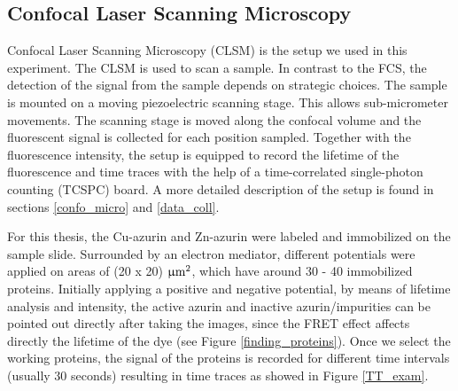 \documentclass[twoside,single]{lion-msc}
\begin{document}
\subsection{Confocal Laser Scanning Microscopy}
Confocal Laser Scanning Microscopy (CLSM) is the setup we used in this experiment. The CLSM is used to scan a sample. In contrast to the FCS, the detection of the signal from the sample depends on strategic choices. The sample is mounted on a moving piezoelectric scanning stage. This allows sub-micrometer movements. The scanning stage is moved along the confocal volume and the fluorescent signal is collected for each position sampled. Together with the fluorescence intensity, the setup is equipped to record the lifetime of the fluorescence and time traces with the help of a time-correlated single-photon counting (TCSPC) board. A more detailed description of the setup is found in sections \ref{confo_micro} and \ref{data_coll}.

For this thesis, the Cu-azurin and Zn-azurin were labeled and immobilized on the sample slide. Surrounded by an electron mediator, different potentials were applied on areas of (20 x 20) $\upmu \textup{m}^{2}$, which have around 30 - 40 immobilized proteins. Initially applying a positive and negative potential, by means of lifetime analysis and intensity, the active azurin and inactive azurin/impurities can be pointed out directly after taking the images, since the FRET effect affects directly the lifetime of the dye (see Figure \ref{finding_proteins}). Once we select the working proteins, the signal of the proteins is recorded for different time intervals (usually 30 seconds) resulting in time traces as showed in Figure \ref{TT_exam}.
\end{document}
